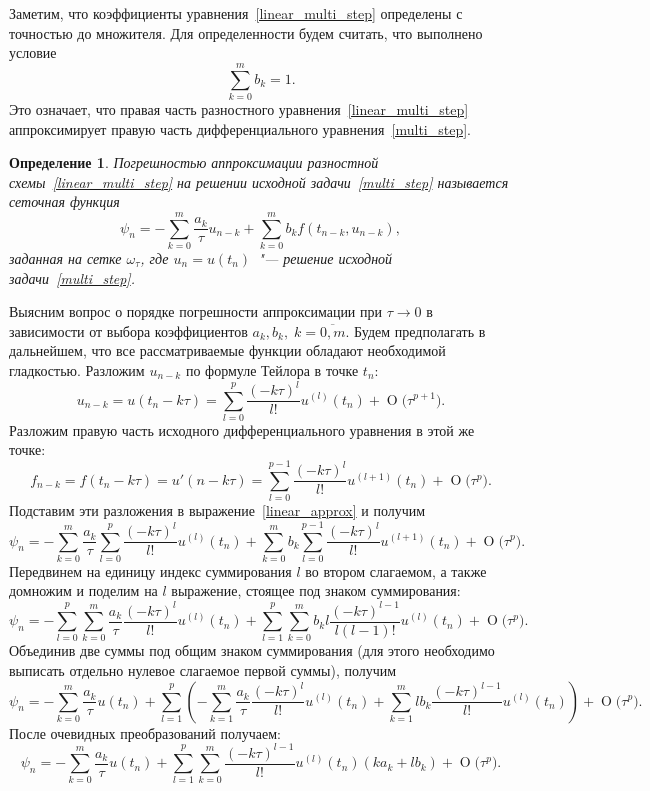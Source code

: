 \documentclass[11pt,a4paper,twoside,listtotoc,bibtotoc]{report}
\numberwithin{equation}{section}
\newtheorem*{definition}{Определение}
\theoremstyle{definition}
\theoremstyle{plain}
\newcommand{\bigO}[1]{\ensuremath{\operatorname{O}\bigl(#1\bigr)}}
\begin{document}
Заметим, что коэффициенты уравнения~\eqref{linear_multi_step} определены с
точностью до множителя. Для определенности будем считать, что
выполнено условие
%
$$
    \sum_{k=0}^m b_k=1.
$$
%
Это означает, что правая часть разностного уравнения~\eqref{linear_multi_step}
аппроксимирует правую часть дифференциального уравнения~\eqref{multi_step}.
%
\begin{definition}
%
    Погрешностью аппроксимации разностной схемы~\eqref{linear_multi_step}
    на решении исходной задачи~\eqref{multi_step} называется сеточная функция
    \begin{equation}
        \label{linear_approx}
        \psi_n = -\sum_{k=0}^m\frac{a_k}{\tau}u_{n-k}+\sum_{k=0}^m b_k
        f(t_{n-k},u_{n-k}),
    \end{equation}
    заданная на сетке $\omega_\tau$, где $u_n=u(t_n)$~"--- решение исходной задачи~\eqref{multi_step}.
%
\end{definition}
%

Выясним вопрос о порядке погрешности аппроксимации при $\tau \to 0$ в зависимости
от выбора коэффициентов $a_k, b_k,\;k=\overline{0, m}$.
Будем предполагать в дальнейшем, что все рассматриваемые функции обладают необходимой
гладкостью. Разложим $u_{n-k}$ по формуле Тейлора в точке $t_n$:
%
$$
    u_{n-k} = u(t_n-k\tau) = \sum_{l=0}^p \dfrac{(-k\tau)^l}{l!}
    u^{(l)}(t_n) + \bigO{\tau^{p+1}}.
$$
%
Разложим правую часть исходного дифференциального уравнения в этой же точке:
%
$$
    f_{n-k} = f(t_n - k\tau) = u'(n-k\tau)
    = \sum_{l=0}^{p-1} \dfrac{(-k\tau)^l}{l!}
    u^{(l+1)}(t_n) + \bigO{\tau^p}.
$$
%
Подставим эти разложения в выражение~\eqref{linear_approx} и получим
%
$$
    \psi_n = - \sum_{k=0}^m \dfrac{a_k}{\tau} \sum_{l=0}^p \dfrac{(-k\tau)^l}
    {l!} u^{(l)}(t_n) + \sum_{k=0}^m b_k \sum_{l=0}^{p-1} \dfrac{(-k\tau)^l}
    {l!} u^{(l+1)}(t_n) + \bigO{\tau^p}.
$$
%
Передвинем на единицу индекс суммирования $l$ во втором слагаемом, а также домножим
и поделим на $l$ выражение, стоящее под знаком суммирования:
%
$$
    \psi_n = - \sum_{l=0}^p \sum_{k=0}^m \dfrac{a_k}{\tau} \dfrac{(-k\tau)^l}{l!}
    u^{(l)}(t_n) + \sum_{l=1}^p \sum_{k=0}^m b_kl \dfrac{(-k\tau)^{l-1}}
    {l(l-1)!} u^{(l)}(t_n) + \bigO{\tau^p}.
$$
%
Объединив две суммы под общим знаком суммирования (для этого
необходимо выписать отдельно нулевое слагаемое первой суммы), получим
%
$$
    \psi_n = - \sum_{k=0}^m \dfrac{a_k}{\tau} u(t_n) + \sum \limits_{l=1}^p
    \left(-\sum_{k=1}^m \dfrac{a_k}{\tau} \dfrac{(-k\tau)^l}{l!} u^{(l)}(t_n)
     + \sum_{k=1}^m lb_k \dfrac{(-k\tau)^{l-1}}{l!} u^{(l)}(t_n)\right) +\bigO{\tau^p}.
$$
%
После очевидных преобразований получаем:
%
$$
    \psi_n = - \sum_{k=0}^m \dfrac{a_k}{\tau} u(t_n) + \sum_{l=1}^p \sum_{k=0}^m
     \dfrac{(-k\tau)^{l-1}}{l!} u^{(l)}(t_n) (ka_k + lb_k) + \bigO{\tau^p}.
$$
%
\end{document}
